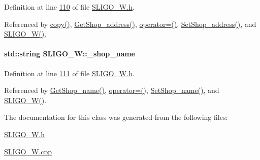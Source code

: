 Definition at line \hyperlink{_s_l_i_g_o___w_8h_source_l00110}{110} of file \hyperlink{_s_l_i_g_o___w_8h_source}{S\+L\+I\+G\+O\+\_\+\+W.\+h}.



Referenced by \hyperlink{_s_l_i_g_o___w_8cpp_source_l00035}{copy()}, \hyperlink{_s_l_i_g_o___w_8cpp_source_l00129}{Get\+Shop\+\_\+address()}, \hyperlink{_s_l_i_g_o___w_8h_source_l00075}{operator=()}, \hyperlink{_s_l_i_g_o___w_8cpp_source_l00125}{Set\+Shop\+\_\+address()}, and \hyperlink{_s_l_i_g_o___w_8h_source_l00024}{S\+L\+I\+G\+O\+\_\+\+W()}.

\paragraph[{\texorpdfstring{\+\_\+shop\+\_\+name}{_shop_name}}]{\setlength{\rightskip}{0pt plus 5cm}std\+::string S\+L\+I\+G\+O\+\_\+\+W\+::\+\_\+shop\+\_\+name\hspace{0.3cm}{\ttfamily [private]}}\hypertarget{class_s_l_i_g_o___w_a01bebef43ff4b4d9d728489f05b94d86_a01bebef43ff4b4d9d728489f05b94d86}{}\label{class_s_l_i_g_o___w_a01bebef43ff4b4d9d728489f05b94d86_a01bebef43ff4b4d9d728489f05b94d86}


Definition at line \hyperlink{_s_l_i_g_o___w_8h_source_l00111}{111} of file \hyperlink{_s_l_i_g_o___w_8h_source}{S\+L\+I\+G\+O\+\_\+\+W.\+h}.



Referenced by \hyperlink{_s_l_i_g_o___w_8cpp_source_l00121}{Get\+Shop\+\_\+name()}, \hyperlink{_s_l_i_g_o___w_8h_source_l00075}{operator=()}, \hyperlink{_s_l_i_g_o___w_8cpp_source_l00117}{Set\+Shop\+\_\+name()}, and \hyperlink{_s_l_i_g_o___w_8h_source_l00024}{S\+L\+I\+G\+O\+\_\+\+W()}.



The documentation for this class was generated from the following files\+:\begin{DoxyCompactItemize}
\item 
\hyperlink{_s_l_i_g_o___w_8h}{S\+L\+I\+G\+O\+\_\+\+W.\+h}\item 
\hyperlink{_s_l_i_g_o___w_8cpp}{S\+L\+I\+G\+O\+\_\+\+W.\+cpp}\end{DoxyCompactItemize}
